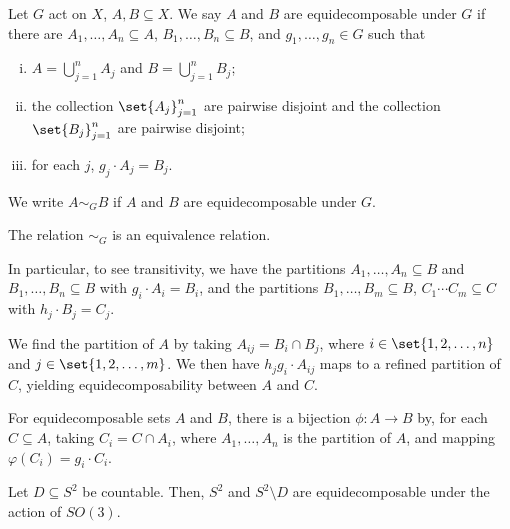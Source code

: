 \documentclass[10pt]{mypackage}
\begin{document}
\begin{definition}
  Let $G$ act on $X$, $A,B\subseteq X$. We say $A$ and $B$ are equidecomposable under $G$ if there are $A_1,\dots,A_n\subseteq A$, $B_1,\dots,B_n\subseteq B$, and $g_1,\dots,g_n\in G$ such that
  \begin{enumerate}[(i)]
    \item $A = \bigcup_{j=1}^{n}A_j$ and $B = \bigcup_{j=1}^{n}B_j$;
    \item the collection $\set{A_j}_{j=1}^{n}$ are pairwise disjoint and the collection $\set{B_j}_{j=1}^{n}$ are pairwise disjoint;
    \item for each $j$, $g_j\cdot A_j = B_j$.
  \end{enumerate}
  We write $A\sim_{G} B$ if $A$ and $B$ are equidecomposable under $G$.
\end{definition}
\begin{remark}
  The relation $\sim_{G}$ is an equivalence relation.\newline

  In particular, to see transitivity, we have the partitions $A_1,\dots,A_n\subseteq B$ and $B_1,\dots,B_n\subseteq B$ with $g_i\cdot A_i = B_i$, and the partitions $B_1,\dots,B_m\subseteq B$, $C_1\cdots C_m\subseteq C$ with $h_j\cdot B_j = C_j$.\newline

  We find the partition of $A$ by taking $A_{ij} = B_i\cap B_j$, where $i\in \set{1,2,\dots,n}$ and $j\in \set{1,2,\dots,m}$. We then have $h_jg_i\cdot A_{ij}$ maps to a refined partition of $C$, yielding equidecomposability between $A$ and $C$.
\end{remark}
\begin{remark}
  For equidecomposable sets $A$ and $B$, there is a bijection $\phi: A\rightarrow B$ by, for each $C\subseteq A$, taking $C_{i} = C\cap A_i$, where $A_1,\dots,A_n$ is the partition of $A$, and mapping $\varphi\left(C_i\right) = g_i\cdot C_i$.
\end{remark}
\begin{proposition}
  Let $D\subseteq S^2$ be countable. Then, $S^2$ and $S^{2}\setminus D$ are equidecomposable under the action of $SO(3)$.
\end{proposition}
\end{document}
